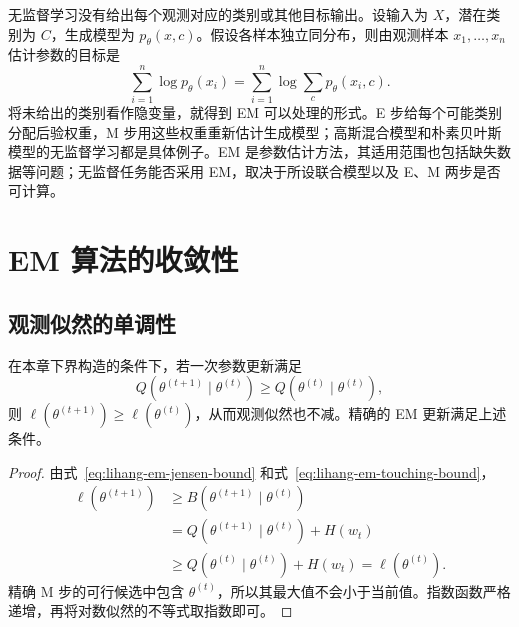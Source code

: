 无监督学习没有给出每个观测对应的类别或其他目标输出。设输入为 $X$，潜在类别为 $C$，生成模型为 $p_\theta(x,c)$。假设各样本独立同分布，则由观测样本 $x_1,\ldots,x_n$ 估计参数的目标是
\[
  \sum_{i=1}^n\log p_\theta(x_i)
  =\sum_{i=1}^n\log\sum_c p_\theta(x_i,c).
\]
将未给出的类别看作隐变量，就得到 EM 可以处理的形式。E 步给每个可能类别分配后验权重，M 步用这些权重重新估计生成模型；高斯混合模型和朴素贝叶斯模型的无监督学习都是具体例子。EM 是参数估计方法，其适用范围也包括缺失数据等问题；无监督任务能否采用 EM，取决于所设联合模型以及 E、M 两步是否可计算。

\section{EM 算法的收敛性}
\label{sec:lihang-em-convergence}

\subsection{观测似然的单调性}

\begin{theorem}[提高 $Q$ 函数足以保持似然单调]
\label{thm:lihang-em-monotonicity}
在本章下界构造的条件下，若一次参数更新满足
\[
  Q(\theta^{(t+1)}\mid\theta^{(t)})\geq Q(\theta^{(t)}\mid\theta^{(t)}),
\]
则 $\ell(\theta^{(t+1)})\geq\ell(\theta^{(t)})$，从而观测似然也不减。精确的 EM 更新满足上述条件。
\end{theorem}

\begin{proof}
由式~\eqref{eq:lihang-em-jensen-bound} 和式~\eqref{eq:lihang-em-touching-bound}，
\begin{equation}
  \begin{aligned}
    \ell(\theta^{(t+1)})
    &\geq B(\theta^{(t+1)}\mid\theta^{(t)})\\
    &=Q(\theta^{(t+1)}\mid\theta^{(t)})+H(w_t)\\
    &\geq Q(\theta^{(t)}\mid\theta^{(t)})+H(w_t)
    =\ell(\theta^{(t)}).
  \end{aligned}
  \label{eq:lihang-em-monotonicity-chain}
\end{equation}
精确 M 步的可行候选中包含 $\theta^{(t)}$，所以其最大值不会小于当前值。指数函数严格递增，再将对数似然的不等式取指数即可。
\end{proof}

